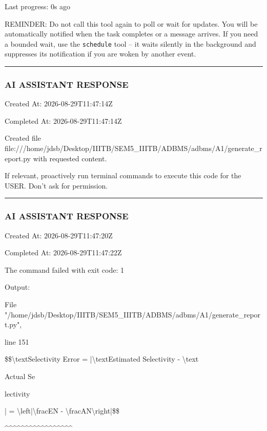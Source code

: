 \documentclass[11pt,a4paper]{article}
\begin{document}
{Last progress: 0s ago



REMINDER: Do not call this tool again to poll or wait for updates. You will be automatically notified when the task completes or a message arrives. If you need a bounded wait, use the \texttt{schedule} tool -- it waits silently in the background and suppresses its notification if you are woken by another event.


\hrule

\subsubsection{AI ASSISTANT RESPONSE}

Created At: 2026-08-29T11:47:14Z

Completed At: 2026-08-29T11:47:14Z

Created file file:///home/jdsb/Desktop/IIITB/SEM5\_IIITB/ADBMS/adbms/A1/generate\_report.py with requested content.

If relevant, proactively run terminal commands to execute this code for the USER. Don't ask for permission.


\hrule

\subsubsection{AI ASSISTANT RESPONSE}

Created At: 2026-08-29T11:47:20Z

Completed At: 2026-08-29T11:47:22Z


The command failed with exit code: 1

Output:

File "/home/jdsb/Desktop/IIITB/SEM5\_IIITB/ADBMS/adbms/A1/generate\_report.py",

line 151

\$\$\textbackslash{}text{Selectivity Error} = |\textbackslash{}text{Estimated Selectivity} - \textbackslash{}text{Actual Se

lectivity}| = \textbackslash{}left|\textbackslash{}frac{E}{N} - \textbackslash{}frac{A}{N}\textbackslash{}right|\$\$

\textasciicircum{}\textasciicircum{}\textasciicircum{}\textasciicircum{}\textasciicircum{}\textasciicircum{}\textasciicircum{}\textasciicircum{}\textasciicircum{}\textasciicircum{}\textasciicircum{}\textasciicircum{}\textasciicircum{}\textasciicircum{}\textasciicircum{}\textasciicircum{}\textasciicircum{}

}
\end{document}
